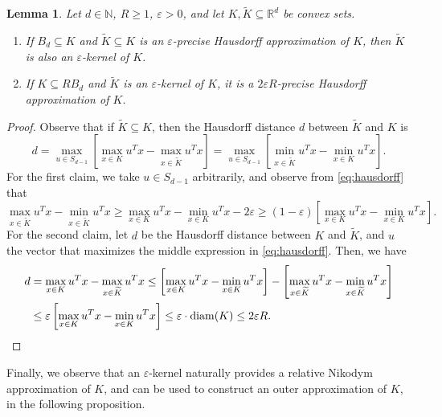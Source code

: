 \documentclass[11pt]{article}
\newtheorem{lemma}[theorem]{Lemma}
\newcommand{\N}{\ensuremath{\mathbb{N}}}
\newcommand{\R}{\ensuremath{\mathbb{R}}}
\DeclareMathOperator{\diam}{diam}
\begin{document}
    \begin{lemma}
        \label{lem:eps-kernel-hausdorff}
        Let $d \in \N$, $R \geq 1$, $\varepsilon > 0$, and let $K, \widetilde{K} \subseteq \R^d$ be convex sets.
        \begin{enumerate}[nosep]
            \item If $B_d \subseteq K$ and $\widetilde{K} \subseteq K$ is an $\varepsilon$-precise Hausdorff approximation of $K$, then $\widetilde{K}$ is also an $\varepsilon$-kernel of $K$.
            \item If $K \subseteq RB_d$ and $\widetilde{K}$ is an $\varepsilon$-kernel of $K$, it is a $2\varepsilon R$-precise Hausdorff approximation of $K$.
        \end{enumerate}
    \end{lemma}

    \begin{proof}
        Observe that if $\widetilde{K} \subseteq K$, then the Hausdorff distance $d$ between $\widetilde{K}$ and $K$ is
        \begin{equation}
            \label{eq:hausdorff}
            d = \max_{u \in S_{d-1}} \left[\max_{x \in K} u^Tx - \max_{x \in \widetilde{K}} u^Tx\right] = \max_{u \in S_{d-1}} \left[\min_{x \in \widetilde{K}} u^Tx - \min_{x \in K} u^Tx\right].
        \end{equation}
        For the first claim, we take $u \in S_{d-1}$ arbitrarily, and observe from \cref{eq:hausdorff} that
        \[\max_{x \in \widetilde{K}} u^Tx - \min_{x \in \widetilde{K}} u^Tx \geq \max_{x \in K} u^Tx - \min_{x \in K} u^Tx - 2\varepsilon \geq (1-\varepsilon)\left[\max_{x \in K} u^Tx - \min_{x \in K} u^Tx\right].\]
        For the second claim, let $d$ be the Hausdorff distance between $K$ and $\widetilde{K}$, and $u$ the vector that maximizes the middle expression in \cref{eq:hausdorff}. Then, we have
        \begin{align*}
            d &= \max_{x \in K} u^Tx - \max_{x \in \widetilde{K}} u^Tx \leq \left[\max_{x \in K} u^Tx - \min_{x \in K} u^Tx\right] - \left[\max_{x \in \widetilde{K}} u^Tx - \min_{x \in \widetilde{K}} u^Tx\right] \\
            &\leq \varepsilon\left[\max_{x \in K} u^Tx - \min_{x \in K} u^Tx\right] \leq \varepsilon \cdot \diam(K) \leq 2\varepsilon R.\qedhere
        \end{align*}
    \end{proof}

    Finally, we observe that an $\varepsilon$-kernel naturally provides a relative Nikodym approximation of $K$, and can be used to construct an outer approximation of $K$, in the following proposition.
\end{document}
